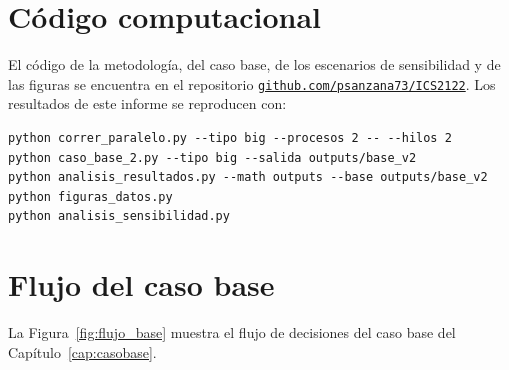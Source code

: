 \section{Código computacional}\label{ap:codigo}

El código de la metodología, del caso base, de los escenarios de sensibilidad y de las figuras se encuentra en el repositorio \href{https://github.com/psanzana73/ICS2122}{\texttt{github.com/psanzana73/ICS2122}}. Los resultados de este informe se reproducen con:
\begin{verbatim}
python correr_paralelo.py --tipo big --procesos 2 -- --hilos 2
python caso_base_2.py --tipo big --salida outputs/base_v2
python analisis_resultados.py --math outputs --base outputs/base_v2
python figuras_datos.py
python analisis_sensibilidad.py
\end{verbatim}

\section{Flujo del caso base}\label{ap:base}

La Figura~\ref{fig:flujo_base} muestra el flujo de decisiones del caso base del Capítulo~\ref{cap:casobase}.

